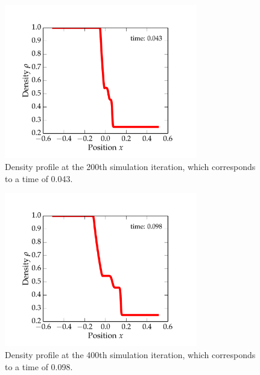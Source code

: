 \documentclass{article}
\begin{document}
\begin{spacing}{1.1}
\begin{figure}[H]
 \centering
 \hspace{0cm} \includegraphics[width=0.75\textwidth]{figs-pc/200.pdf}
 \caption{Density profile at the 200th simulation iteration, which corresponds to a time of 0.043.}
\end{figure} 

\begin{figure}[H]
 \centering
 \hspace{0cm} \includegraphics[width=0.75\textwidth]{figs-pc/400.pdf}
 \caption{Density profile at the 400th simulation iteration, which corresponds to a time of 0.098.}
\end{figure} 


\end{spacing}
\end{document}
